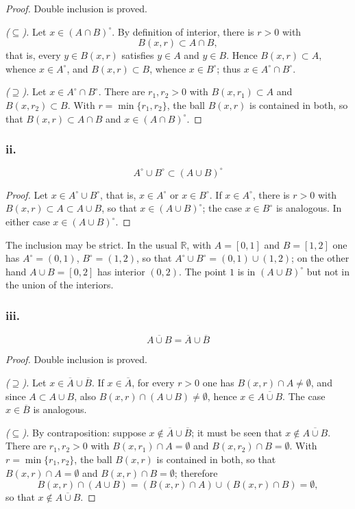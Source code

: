 \documentclass[11pt, a4paper]{article}
\begin{document}
\begin{proof}
Double inclusion is proved.

\textit{($\subseteq$).} Let $x \in (A \cap B)^\circ$. By definition of interior, there is $r > 0$ with
$$ B(x, r) \subset A \cap B, $$
that is, every $y \in B(x, r)$ satisfies $y \in A$ and $y \in B$. Hence $B(x, r) \subset A$, whence
$x \in A^\circ$, and $B(x, r) \subset B$, whence $x \in B^\circ$; thus $x \in A^\circ \cap B^\circ$.

\textit{($\supseteq$).} Let $x \in A^\circ \cap B^\circ$. There are $r_1, r_2 > 0$ with
$B(x, r_1) \subset A$ and $B(x, r_2) \subset B$. With $r = \min\{r_1, r_2\}$, the ball $B(x, r)$ is
contained in both, so that $B(x, r) \subset A \cap B$ and $x \in (A \cap B)^\circ$.
\end{proof}

\subsubsection*{ii.}
$$ A^\circ \cup B^\circ \subset (A \cup B)^\circ $$

\begin{proof}
Let $x \in A^\circ \cup B^\circ$, that is, $x \in A^\circ$ or $x \in B^\circ$. If $x \in A^\circ$,
there is $r > 0$ with $B(x, r) \subset A \subset A \cup B$, so that $x \in (A \cup B)^\circ$; the case
$x \in B^\circ$ is analogous. In either case $x \in (A \cup B)^\circ$.
\end{proof}

The inclusion may be strict. In the usual $\mathbb{R}$, with $A = [0, 1]$ and $B = [1, 2]$ one has
$A^\circ = (0, 1)$, $B^\circ = (1, 2)$, so that $A^\circ \cup B^\circ = (0, 1) \cup (1, 2)$; on the
other hand $A \cup B = [0, 2]$ has interior $(0, 2)$. The point $1$ is in $(A \cup B)^\circ$ but not
in the union of the interiors.

\subsubsection*{iii.}
$$ \overline{A \cup B} = \overline{A} \cup \overline{B} $$

\begin{proof}
Double inclusion is proved.

\textit{($\supseteq$).} Let $x \in \overline{A} \cup \overline{B}$. If $x \in \overline{A}$, for
every $r > 0$ one has $B(x, r) \cap A \neq \emptyset$, and since $A \subset A \cup B$, also
$B(x, r) \cap (A \cup B) \neq \emptyset$, hence $x \in \overline{A \cup B}$. The case
$x \in \overline{B}$ is analogous.

\textit{($\subseteq$).} By contraposition: suppose $x \notin \overline{A} \cup \overline{B}$;
it must be seen that $x \notin \overline{A \cup B}$. There are $r_1, r_2 > 0$ with $B(x, r_1) \cap A =
\emptyset$ and $B(x, r_2) \cap B = \emptyset$. With $r = \min\{r_1, r_2\}$, the ball $B(x, r)$ is
contained in both, so that $B(x, r) \cap A = \emptyset$ and $B(x, r) \cap B = \emptyset$; therefore
$$ B(x, r) \cap (A \cup B) = (B(x, r) \cap A) \cup (B(x, r) \cap B) = \emptyset, $$
so that $x \notin \overline{A \cup B}$.
\end{proof}
\end{document}
